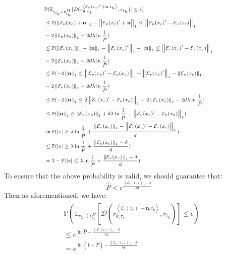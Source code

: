 \begin{align}
\scriptsize
\begin{split}
&\mathbb{P}(\mathbb{E}_{r_{t_h}\in\mathbf{r}_{t_h}^M}[\mathcal{D}(r_{\theta, \tau_1}^{\left<\mathcal{E}_v(x_c)^{\prime}+\mathbf{n}, t_h\right>}, r_{t_h})]\leq\epsilon)\\
&\leq\mathbb{P}(\left\|\mathcal{E}_v(x_c)+\mathbf{n}\right\|_1-\left\|\mathcal{E}_v(x_c)^{\prime}+\mathbf{n}\right\|_1\leq\left\|\mathcal{E}_v(x_c)^{\prime}-\mathcal{E}_v(x_c)\right\|_1\\
&-2\left\|\mathcal{E}_v(x_c)\right\|_1-2d\lambda\ln\frac{1}{\hat{P}})\\
&\leq\mathbb{P}(\left\|\mathcal{E}_v(x_c)\right\|_1-\left\|\mathbf{n}\right\|_1-\left\|\mathcal{E}_v(x_c)^{\prime}\right\|_1-\left\|\mathbf{n}\right\|_1\leq\left\|\mathcal{E}_v(x_c)^{\prime}-\mathcal{E}_v(x_c)\right\|_1\\
&-2\left\|\mathcal{E}_v(x_c)\right\|_1-2d\lambda\ln\frac{1}{\hat{P}})\\
&\leq\mathbb{P}(-2\left\|\mathbf{n}\right\|_1\leq\left\|\mathcal{E}_v(x_c)^{\prime}-\mathcal{E}_v(x_c)\right\|_1+\left\|\mathcal{E}_v(x_c)^{\prime}\right\|_1-\left\|\mathcal{E}_v(x_c)\right\|_1\\
&-2\left\|\mathcal{E}_v(x_c)\right\|_1-2d\lambda\ln\frac{1}{\hat{P}})\\
&\leq\mathbb{P}(-2\left\|\mathbf{n}\right\|_1\leq2\left\|\mathcal{E}_v(x_c)^{\prime}-\mathcal{E}_v(x_c)\right\|_1-2\left\|\mathcal{E}_v(x_c)\right\|_1-2d\lambda\ln\frac{1}{\hat{P}})\\
&\leq\mathbb{P}(\left\|\mathbf{n}\right\|_1\geq\left\|\mathcal{E}_v(x_c)\right\|_1+d\lambda\ln\frac{1}{\hat{P}}-\left\|\mathcal{E}_v(x_c)^{\prime}-\mathcal{E}_v(x_c)\right\|_1)\\
&\approx\mathbb{P}(|e|\geq\lambda\ln\frac{1}{\hat{P}}+\frac{\left\|\mathcal{E}_v(x_c)\right\|_1-\left\|\mathcal{E}_v(x_c)^{\prime}-\mathcal{E}_v(x_c)\right\|_1}{d})\\
&\leq\mathbb{P}(|e|\geq\lambda\ln\frac{1}{\hat{P}}+\frac{\left\|\mathcal{E}_v(x_c)\right\|_1-\delta}{d})\\
&= 1-\mathbb{P}(|e|\leq\lambda\ln\frac{1}{\hat{P}}+\frac{\left\|\mathcal{E}_v(x_c)\right\|_1-\delta}{d})\\
\end{split}
\end{align}
To ensure that the above probability is valid, we should guarantee that:
\begin{equation}
\hat{P} < e^{\frac{\left\|\mathcal{E}_v(x_c)\right\|_1-\delta}{\lambda d}}
\end{equation}
Then as aforementioned, we have:
\begin{align}
\begin{split}
&\mathbb{P}(\mathbb{E}_{r_{t_h}\in\mathbf{r}_{t_h}^M}[\mathcal{D}(r_{\theta, \tau_1}^{\left<\mathcal{E}_v(x_c)^{\prime}+\mathbf{n}, t_h\right>}, r_{t_h})]\leq\epsilon)\\
&\leq e^{\ln\hat{P}-\frac{\left\|\mathcal{E}_v(x_c)\right\|_1-\delta}{\lambda d}}\\
&=e^{\ln(1-\tilde{P})-\frac{\left\|\mathcal{E}_v(x_c)\right\|_1-\delta}{\lambda d}}
\end{split}
\end{align}
